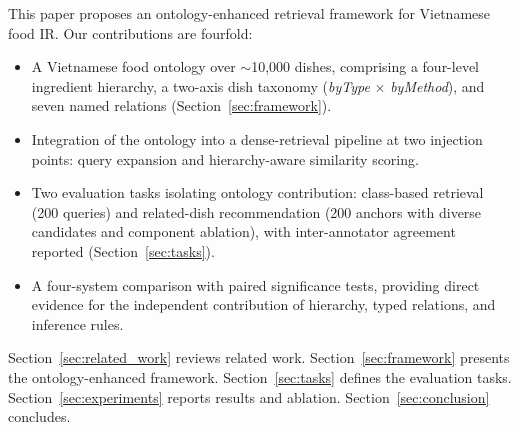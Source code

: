 This paper proposes an ontology-enhanced retrieval framework for Vietnamese food IR. Our contributions are fourfold:
\begin{itemize}
  \item A Vietnamese food ontology over ${\sim}$10{,}000 dishes, comprising a four-level ingredient hierarchy, a two-axis dish taxonomy (\emph{byType} $\times$ \emph{byMethod}), and seven named relations (Section~\ref{sec:framework}).
  \item Integration of the ontology into a dense-retrieval pipeline at two injection points: query expansion and hierarchy-aware similarity scoring.
  \item Two evaluation tasks isolating ontology contribution: class-based retrieval (200 queries) and related-dish recommendation (200 anchors with diverse candidates and component ablation), with inter-annotator agreement reported (Section~\ref{sec:tasks}).
  \item A four-system comparison with paired significance tests, providing direct evidence for the independent contribution of hierarchy, typed relations, and inference rules.
\end{itemize}

Section~\ref{sec:related_work} reviews related work. Section~\ref{sec:framework} presents the ontology-enhanced framework. Section~\ref{sec:tasks} defines the evaluation tasks. Section~\ref{sec:experiments} reports results and ablation. Section~\ref{sec:conclusion} concludes.
